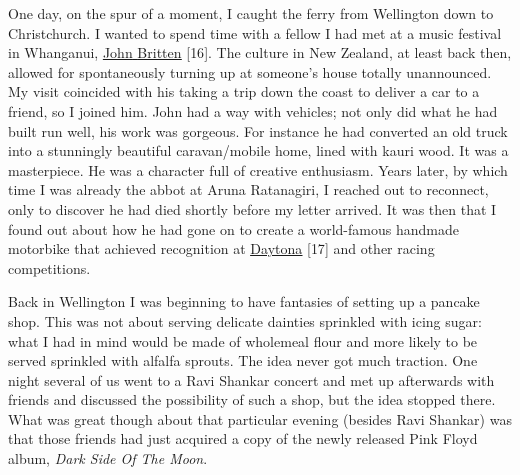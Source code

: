 One day, on the spur of a moment, I caught the ferry from Wellington
down to Christchurch. I wanted to spend time with a fellow I had met at
a music festival in Whanganui,
\href{https://drivetribe.com/p/the-john-britten-story-RQiuVwZCTFu_23AaNBIkLQ?iid=G2z_EpfWTluTG3v255GJFQ}{\underline{John}
\underline{Britten}} {[}16{]}. The culture in New Zealand, at least back
then, allowed for spontaneously turning up at someone's house totally
unannounced. My visit coincided with his taking a trip down the coast to
deliver a car to a friend, so I joined him. John had a way with
vehicles; not only did what he had built run well, his work was
gorgeous. For instance he had converted an old truck into a stunningly
beautiful caravan/mobile home, lined with kauri wood. It was a
masterpiece. He was a character full of creative enthusiasm. Years
later, by which time I was already the abbot at Aruna Ratanagiri, I
reached out to reconnect, only to discover he had died shortly before my
letter arrived. It was then that I found out about how he had gone on to
create a world-famous handmade motorbike that achieved recognition at
\href{https://en.wikipedia.org/wiki/Britten_V1000}{\underline{Daytona}}
{[}17{]} and other racing competitions.

Back in Wellington I was beginning to have fantasies of setting up a
pancake shop. This was not about serving delicate dainties sprinkled
with icing sugar: what I had in mind would be made of wholemeal flour
and more likely to be served sprinkled with alfalfa sprouts. The idea
never got much traction. One night several of us went to a Ravi Shankar
concert and met up afterwards with friends and discussed the possibility
of such a shop, but the idea stopped there. What was great though about
that particular evening (besides Ravi Shankar) was that those friends
had just acquired a copy of the newly released Pink Floyd album,
\emph{Dark Side Of The Moon}.

